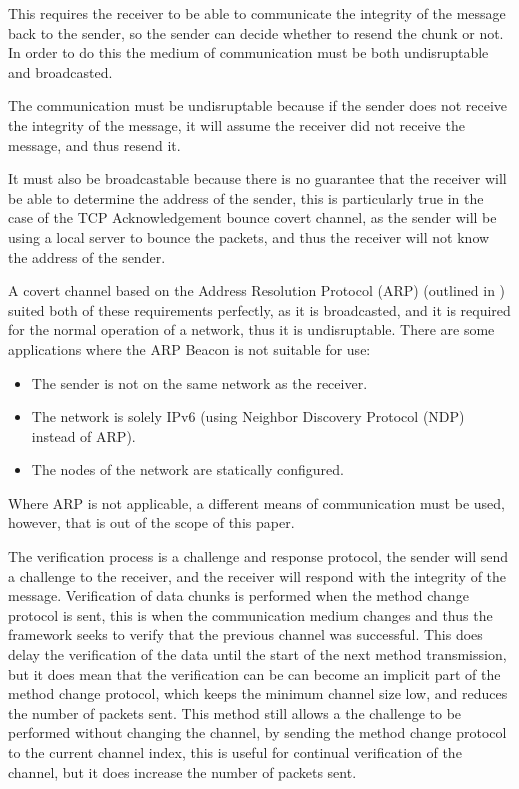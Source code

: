 This requires the receiver to be able to communicate the integrity of the message back to the sender, so the sender can decide whether to resend the chunk or not. In order to do this the medium of communication must be both undisruptable and broadcasted.

The communication must be undisruptable because if the sender does not receive the integrity of the message, it will assume the receiver did not receive the message, and thus resend it.

It must also be broadcastable because there is no guarantee that the receiver will be able to determine the address of the sender, this is particularly true in the case of the TCP Acknowledgement bounce covert channel, as the sender will be using a local server to bounce the packets, and thus the receiver will not know the address of the sender.

A covert channel based on the Address Resolution Protocol (ARP) (outlined in ) suited both of these requirements perfectly, as it is broadcasted, and it is required for the normal operation of a network, thus it is undisruptable. There are some applications where the ARP Beacon is not suitable for use:

\begin{itemize}
    \item The sender is not on the same network as the receiver.
    \item The network is solely IPv6 (using Neighbor Discovery Protocol (NDP) instead of ARP).
    \item The nodes of the network are statically configured.
\end{itemize}

Where ARP is not applicable, a different means of communication must be used, however, that is out of the scope of this paper.

The verification process is a challenge and response protocol, the sender will send a challenge to the receiver, and the receiver will respond with the integrity of the message. Verification of data chunks is performed when the method change protocol is sent, this is when the communication medium changes and thus the framework seeks to verify that the previous channel was successful. This does delay the verification of the data until the start of the next method transmission, but it does mean that the verification can be can become an implicit part of the method change protocol, which keeps the minimum channel size low, and reduces the number of packets sent. This method still allows a 
the challenge to be performed without changing the channel, by sending the method change protocol to the current channel index, this is useful for continual verification of the channel, but it does increase the number of packets sent.

